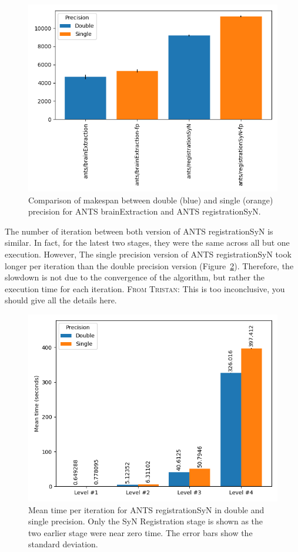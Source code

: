 \documentclass[conference]{IEEEtran}
\newcommand{\TG}[1]{\color{blue}\textsc{From Tristan: }#1\color{black}}
\begin{document}
\begin{figure}[h]
	\includegraphics[width=\linewidth]{figures/makespan-ants.png}
	\caption{Comparison of makespan between double (blue) and single (orange) precision for ANTS brainExtraction and ANTS registrationSyN.}
	\label{fig:makespan-ants}
\end{figure}
			
The number of iteration between both version of ANTS registrationSyN is similar. In fact, for the latest two stages, they were the same across all but one execution. However, The single precision version of ANTS registrationSyN took longer per iteration than the double precision version (Figure~\ref{fig:mean-time-per-iteration-ants}). Therefore, the slowdown is not due to the convergence of the algorithm, but rather the execution time for each iteration. \TG{This is too inconclusive, you should give all the details here.}

\begin{figure}
	\includegraphics[width=\linewidth]{figures/ants-registrationSyN-iteration-mean.png}
	\caption{Mean time per iteration for ANTS registrationSyN in double and single precision. Only the SyN Registration stage is shown as the two earlier stage were near zero time. The error bars show the standard deviation.}
	\label{fig:mean-time-per-iteration-ants}
\end{figure}
						
\end{document}
